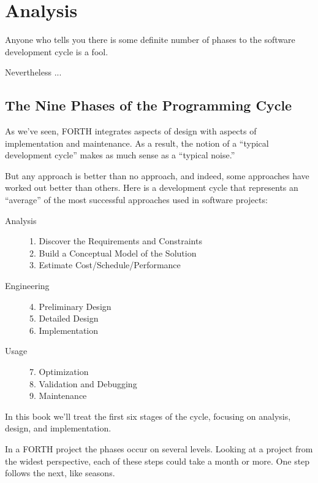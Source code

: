 

\chapter{Analysis}


Anyone who tells you there is some definite number of phases to the
software development cycle is a fool.

Nevertheless ...

\section{The Nine Phases of the Programming Cycle}

As we've seen, FORTH integrates aspects of design with aspects of
implementation and maintenance. As a result, the notion of a ``typical
development cycle'' makes as much sense as a ``typical noise.''

But any approach is better than no approach, and indeed, some
approaches have worked out better than others. Here is a development
cycle that represents an ``average'' of the most successful approaches
used in software projects:

\begin{description}
\item[Analysis]
1. Discover the Requirements and Constraints \\
2. Build a Conceptual Model of the Solution \\
3. Estimate Cost/Schedule/Performance
\item[Engineering] 
4. Preliminary Design \\
5. Detailed Design \\
6. Implementation
\item[Usage]
7. Optimization \\
8. Validation and Debugging \\
9. Maintenance
\end{description}

\noindent In this book we'll treat the first six stages of the cycle,
focusing on analysis, design, and implementation.

In a FORTH project the phases occur on several levels. Looking at a
project from the widest perspective, each of these steps could take a
month or more.  One step follows the next, like seasons.

